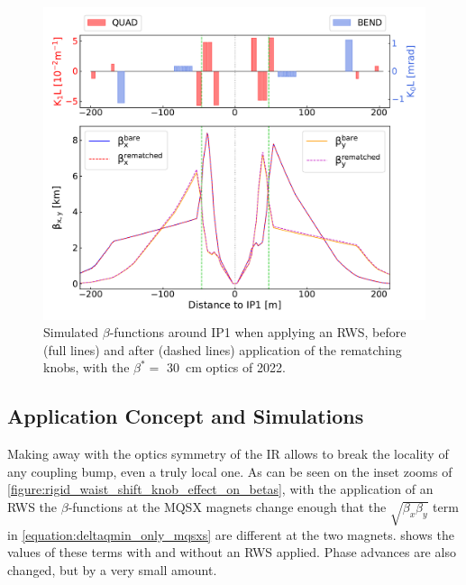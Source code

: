 \begin{figure}[!htb]
    \centering
    \includegraphics[width=\textwidth]{Figures/IR_Coupling_Correction/rws_ir1_rematching.pdf}
    \caption{Simulated \(\beta\)-functions around IP\num{1} when applying an RWS, before (full lines) and after (dashed lines) application of the rematching knobs, with the \(\beta^{\ast} =\) \qty{30}{\centi\metre} optics of \num{2022}.}
    \label{figure:rws_ir1_rematching_betas}
\end{figure}

\subsection{Application Concept and Simulations}
\label{subsection:rws_application_and_simulations}

Making away with the optics symmetry of the \gls{IR} allows to break the locality of any coupling bump, even a truly local one.
As can be seen on the inset zooms of \cref{figure:rigid_waist_shift_knob_effect_on_betas}, with the application of an RWS the \(\beta\)-functions at the MQSX magnets change enough that the \(\sqrt{\beta_x \beta_y}\) term in \cref{equation:deltaqmin_only_mqsxs} are different at the two magnets.
 shows the values of these terms with and without an RWS applied.
Phase advances are also changed, but by a very small amount.

